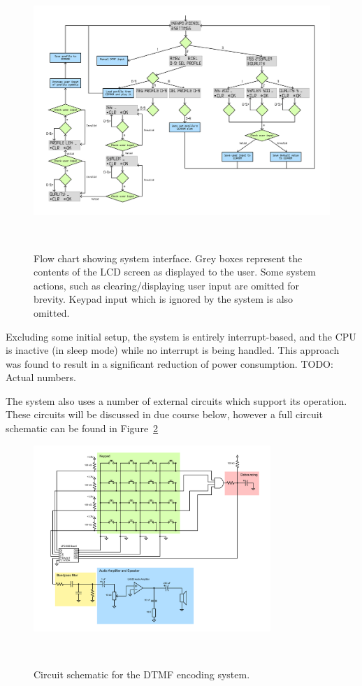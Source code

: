 \documentclass[11pt,a4paper,twocolumn]{scrartcl}
\begin{document}
   \begin{figure}
      \centering
      \includegraphics[height=0.67\textheight, angle=90]{system_flow_chart}
      \caption{Flow chart showing system interface. Grey boxes represent the contents of the LCD screen as displayed to the user. Some system actions, such as clearing/displaying user input are omitted for brevity. Keypad input which is ignored by the system is also omitted.}~\label{fig:system-interface}
   \end{figure}

   Excluding some initial setup, the system is entirely interrupt-based, and the CPU is inactive (in sleep mode) while no interrupt is being handled. This approach was found to result in a significant reduction of power consumption. TODO: Actual numbers.

   The system also uses a number of external circuits which support its operation. These circuits will be discussed in due course below, however a full circuit schematic can be found in Figure~\ref{fig:circuit-schematic}

   \begin{figure}
      \centering
      \includegraphics[width=0.8\textwidth]{circuit_schematic}
      \caption{Circuit schematic for the DTMF encoding system.}~\label{fig:circuit-schematic}
   \end{figure}
\end{document}
